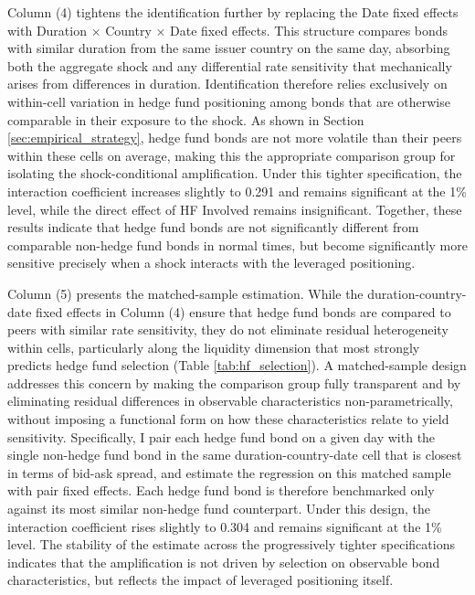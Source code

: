 \documentclass[english, 11pt, oneside]{article}
\begin{document}
Column (4) tightens the identification further by replacing the Date fixed effects with Duration $\times$ Country $\times$ Date fixed effects. This structure compares bonds with similar duration from the same issuer country on the same day, absorbing both the aggregate shock and any differential rate sensitivity that mechanically arises from differences in duration. Identification therefore relies exclusively on within-cell variation in hedge fund positioning among bonds that are otherwise comparable in their exposure to the shock. As shown in Section \ref{sec:empirical_strategy}, hedge fund bonds are not more volatile than their peers within these cells on average, making this the appropriate comparison group for isolating the shock-conditional amplification. Under this tighter specification, the interaction coefficient increases slightly to 0.291 and remains significant at the 1\% level, while the direct effect of HF Involved remains insignificant. Together, these results indicate that hedge fund bonds are not significantly different from comparable non-hedge fund bonds in normal times, but become significantly more sensitive precisely when a shock interacts with the leveraged positioning.

Column (5) presents the matched-sample estimation. While the duration-country-date fixed effects in Column (4) ensure that hedge fund bonds are compared to peers with similar rate sensitivity, they do not eliminate residual heterogeneity within cells, particularly along the liquidity dimension that most strongly predicts hedge fund selection (Table \ref{tab:hf_selection}). A matched-sample design addresses this concern by making the comparison group fully transparent and by eliminating residual differences in observable characteristics non-parametrically, without imposing a functional form on how these characteristics relate to yield sensitivity. Specifically, I pair each hedge fund bond on a given day with the single non-hedge fund bond in the same duration-country-date cell that is closest in terms of bid-ask spread, and estimate the regression on this matched sample with pair fixed effects. Each hedge fund bond is therefore benchmarked only against its most similar non-hedge fund counterpart. Under this design, the interaction coefficient rises slightly to 0.304 and remains significant at the 1\% level. The stability of the estimate across the progressively tighter specifications indicates that the amplification is not driven by selection on observable bond characteristics, but reflects the impact of leveraged positioning itself.
\end{document}
